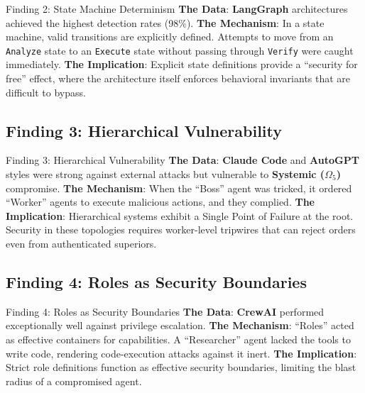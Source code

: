 \documentclass[
  ignorenonframetext,
]{beamer}
\begin{document}
\begin{frame}{Finding 2: State Machine
Determinism}
\textbf{The Data}: \textbf{LangGraph} architectures achieved the highest
detection rates (98\%). \textbf{The Mechanism}: In a state machine,
valid transitions are explicitly defined. Attempts to move from an
\texttt{Analyze} state to an \texttt{Execute} state without passing
through \texttt{Verify} were caught immediately. \textbf{The
Implication}: Explicit state definitions provide a ``security for free''
effect, where the architecture itself enforces behavioral invariants
that are difficult to bypass.
\end{frame}

\subsection{Finding 3: Hierarchical
Vulnerability}\label{finding-3-hierarchical-vulnerability}

\begin{frame}[allowframebreaks]{Finding 3: Hierarchical Vulnerability}
\textbf{The Data}: \textbf{Claude Code} and \textbf{AutoGPT} styles were
strong against external attacks but vulnerable to \textbf{Systemic
(\(\Omega_5\))} compromise. \textbf{The Mechanism}: When the ``Boss''
agent was tricked, it ordered ``Worker'' agents to execute malicious
actions, and they complied. \textbf{The Implication}: Hierarchical
systems exhibit a Single Point of Failure at the root. Security in these
topologies requires worker-level tripwires that can reject orders even
from authenticated superiors.
\end{frame}

\subsection{Finding 4: Roles as Security
Boundaries}\label{finding-4-roles-as-security-boundaries}

\begin{frame}[allowframebreaks]{Finding 4: Roles as Security Boundaries}
\textbf{The Data}: \textbf{CrewAI} performed exceptionally well against
privilege escalation. \textbf{The Mechanism}: ``Roles'' acted as
effective containers for capabilities. A ``Researcher'' agent lacked the
tools to write code, rendering code-execution attacks against it inert.
\textbf{The Implication}: Strict role definitions function as effective
security boundaries, limiting the blast radius of a compromised agent.
\end{frame}
\end{document}
